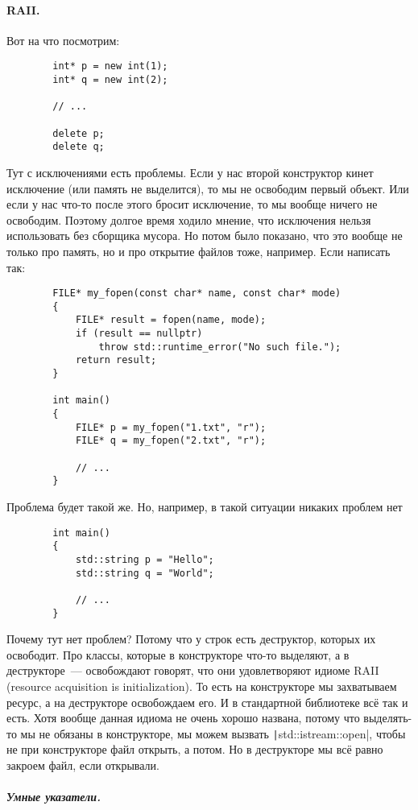 \documentclass{article}
\begin{document}
    \paragraph{RAII.}
    Вот на что посмотрим:
    \begin{verbatim}
        int* p = new int(1);
        int* q = new int(2);

        // ...

        delete p;
        delete q;
    \end{verbatim}
    Тут с исключениями есть проблемы. Если у нас второй конструктор кинет исключение (или память не выделится), то мы не освободим первый объект. Или если у нас что-то после этого бросит исключение, то мы вообще ничего не освободим. Поэтому долгое время ходило мнение, что исключения нельзя использовать без сборщика мусора. Но потом было показано, что это вообще не только про память, но и про открытие файлов тоже, например. Если написать так:
    \begin{verbatim}
        FILE* my_fopen(const char* name, const char* mode)
        {
            FILE* result = fopen(name, mode);
            if (result == nullptr)
                throw std::runtime_error("No such file.");
            return result;
        }

        int main()
        {
            FILE* p = my_fopen("1.txt", "r");
            FILE* q = my_fopen("2.txt", "r");

            // ...
        }
    \end{verbatim}
    Проблема будет такой же. Но, например, в такой ситуации никаких проблем нет
    \begin{verbatim}
        int main()
        {
            std::string p = "Hello";
            std::string q = "World";
            
            // ...
        }
    \end{verbatim}
    Почему тут нет проблем? Потому что у строк есть деструктор, которых их освободит. Про классы, которые в конструкторе что-то выделяют, а в деструкторе~--- освобождают говорят, что они удовлетворяют идиоме RAII (resource acquisition is initialization). То есть на конструкторе мы захватываем ресурс, а на деструкторе освобождаем его. И в стандартной библиотеке всё так и есть. Хотя вообще данная идиома не очень хорошо названа, потому что выделять-то мы не обязаны в конструкторе, мы можем вызвать \texttt|std::istream::open|, чтобы не при конструкторе файл открыть, а потом. Но в деструкторе мы всё равно закроем файл, если открывали.
    \subparagraph{Умные указатели.}
\end{document}

